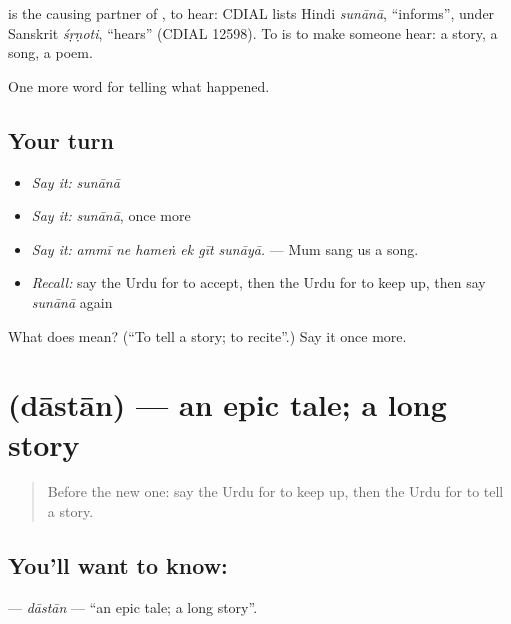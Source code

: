 \begin{cousinweb}
is the causing partner of \textbf{}, to hear: CDIAL lists Hindi \emph{sunānā}, \textquotedblleft{}informs\textquotedblright{}, under Sanskrit \emph{śṛṇoti}, \textquotedblleft{}hears\textquotedblright{} (CDIAL 12598). To \textbf{} is to make someone hear: a story, a song, a poem.
\end{cousinweb}

\begin{grammarlens}[title={What you've built}]
One more word for telling what happened.
\end{grammarlens}

\subsection*{Your turn}
\begin{itemize}
\raggedright
  \item \emph{Say it:} \emph{sunānā}
  \item \emph{Say it:} \emph{sunānā}, once more
  \item \emph{Say it:} \emph{ammī ne hameṅ ek gīt sunāyā.} — Mum sang us a song.
  \item \emph{Recall:} say the Urdu for to accept, then the Urdu for to keep up, then say \emph{sunānā} again
\end{itemize}

\begin{tcolorbox}[breakable,colback=teal!4,colframe=teal!35!black,title={Before you move on}]
What does  mean? (\textquotedblleft{}To tell a story; to recite\textquotedblright{}.) Say it once more.
\end{tcolorbox}
\section[\texorpdfstring{\ur{داستان} (dāstān)}{داستان (dāstān)}]{ (dāstān) — an epic tale; a long story}

\label{lesson:UR-C324-dastan}



\begin{quote}
Before the new one: say the Urdu for to keep up, then the Urdu for to tell a story.
\end{quote}

\subsection*{You'll want to know: }
\textbf{} — \emph{dāstān} — \textquotedblleft{}an epic tale; a long story\textquotedblright{}.

